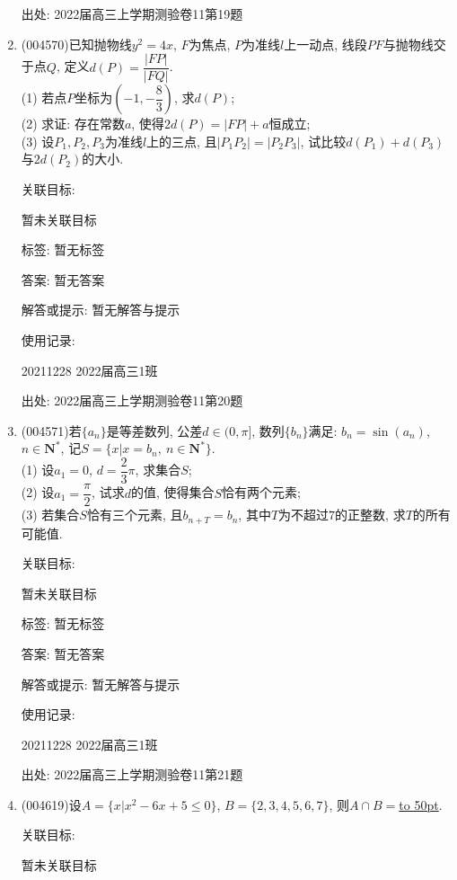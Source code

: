 \documentclass[10pt,a4paper]{article}
\newcommand{\blank}[1]{\underline{\hbox to #1pt{}}}
\begin{document}
\begin{enumerate}[1.]
出处: 2022届高三上学期测验卷11第19题
\item { (004570)}已知抛物线$y^2=4x$, $F$为焦点, $P$为准线$l$上一动点, 线段$PF$与抛物线交于点$Q$, 定义$d(P)=\dfrac{|FP|}{|FQ|}$.\\
(1) 若点$P$坐标为$(-1,-\dfrac 83)$, 求$d(P)$;\\
(2) 求证: 存在常数$a$, 使得$2d(P)=|FP|+a$恒成立;\\
(3) 设$P_1,P_2,P_3$为准线$l$上的三点, 且$|P_1P_2|=|P_2P_3|$, 试比较$d(P_1)+d(P_3)$与$2d(P_2)$的大小.


关联目标:

暂未关联目标



标签: 暂无标签

答案: 暂无答案

解答或提示: 暂无解答与提示

使用记录:

20211228	2022届高三1班			


出处: 2022届高三上学期测验卷11第20题
\item { (004571)}若$\{a_n\}$是等差数列, 公差$d\in (0,\pi]$, 数列$\{b_n\}$满足: $b_n=\sin (a_n)$, $n \in \mathbf{N}^*$, 记$S=\{x|x=b_n, \ n\in \mathbf{N}^*\}$.\\
(1) 设$a_1=0$, $d=\dfrac 23 \pi$, 求集合$S$;\\
(2) 设$a_1=\dfrac\pi 2$, 试求$d$的值, 使得集合$S$恰有两个元素;\\
(3) 若集合$S$恰有三个元素, 且$b_{n+T}=b_n$, 其中$T$为不超过$7$的正整数, 求$T$的所有可能值.


关联目标:

暂未关联目标



标签: 暂无标签

答案: 暂无答案

解答或提示: 暂无解答与提示

使用记录:

20211228	2022届高三1班			


出处: 2022届高三上学期测验卷11第21题
\item { (004619)}设$A=\{x|x^2-6x+5\le 0\}$, $B=\{2,3,4,5,6,7\}$, 则$A\cap B=$\blank{50}.


关联目标:

暂未关联目标




\end{enumerate}
\end{document}
